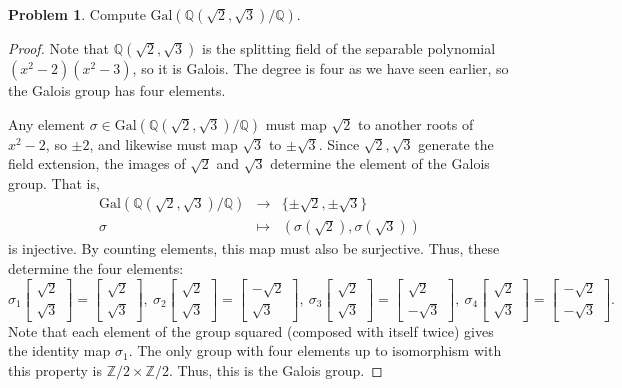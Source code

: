 \documentclass[11pt]{article}
\newcommand{\Q}{\mathbb{Q}}
\newcommand{\Z}{\mathbb{Z}}
\theoremstyle{definition}
\newtheorem{problem}{Problem}
\begin{document}
\begin{problem}
	Compute $\mathrm{Gal}(\Q(\sqrt{2},\sqrt{3})/\Q)$.
\end{problem}
\begin{proof}
Note that $\Q(\sqrt{2},\sqrt{3})$ is the splitting field of the separable polynomial $(x^2-2)(x^2-3)$, so it is Galois. The degree is four as we have seen earlier, so the Galois group has four elements.

Any element $\sigma\in \mathrm{Gal}(\Q(\sqrt{2},\sqrt{3})/\Q)$ must map $\sqrt{2}$ to another roots of $x^2-2$, so $\pm 2$, and likewise must map $\sqrt{3}$ to $\pm \sqrt{3}$. Since $\sqrt{2},\sqrt{3}$ generate the field extension, the images of $\sqrt{2}$ and $\sqrt{3}$ determine the element of the Galois group. That is, 
\[ \begin{array}{ccc} \mathrm{Gal}(\Q(\sqrt{2},\sqrt{3})/\Q) & \to & \{ \pm \sqrt{2} , \pm \sqrt{3}\} \\
\sigma & \mapsto & (\sigma(\sqrt{2}) ,\sigma(\sqrt{3})) \end{array}\]
is injective. By counting elements, this map must also be surjective. Thus, these determine the four elements:
\[ \sigma_1 \begin{bmatrix} \sqrt{2} \\ \sqrt{3} \end{bmatrix} = \begin{bmatrix} \sqrt{2} \\ \sqrt{3} \end{bmatrix}, \ \sigma_2 \begin{bmatrix} \sqrt{2} \\ \sqrt{3} \end{bmatrix} = \begin{bmatrix} -\sqrt{2} \\ \sqrt{3} \end{bmatrix}, \ \sigma_3 \begin{bmatrix} \sqrt{2} \\ \sqrt{3} \end{bmatrix} = \begin{bmatrix} \sqrt{2} \\ -\sqrt{3} \end{bmatrix}, \ \sigma_4 \begin{bmatrix} \sqrt{2} \\ \sqrt{3} \end{bmatrix} = \begin{bmatrix} -\sqrt{2} \\ -\sqrt{3} \end{bmatrix}.\]
Note that each element of the group squared (composed with itself twice) gives the identity map $\sigma_1$. The only group with four elements up to isomorphism with this property is $\Z/2 \times \Z/2$. Thus, this is the Galois group.
\end{proof}
\end{document}

